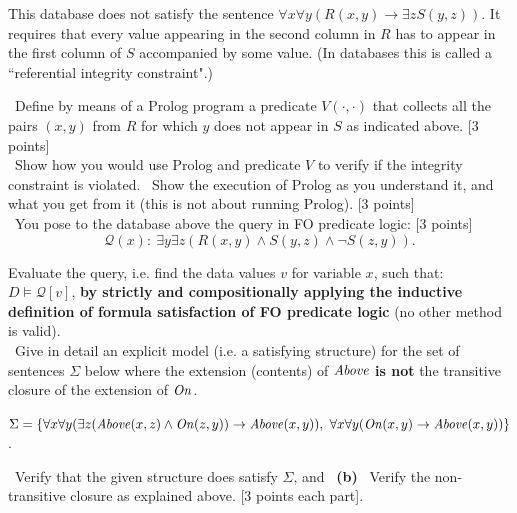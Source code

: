 \documentclass[12pt,fullpage]{article}
\newcommand{\nit}[1]{{\it #1}}
\begin{document}
\vspace{1mm}This database does not satisfy the sentence $\forall x \forall y(R(x,y) \rightarrow \exists zS(y,z))$. It requires that every value appearing in the second
column in $R$ has to appear in the first column of $S$ accompanied by some value. (In databases this is called a ``referential integrity constraint".)

\vspace{2mm}
 \ Define by means of a Prolog program a predicate $V(\cdot,\cdot)$ that collects all the pairs $(x,y)$ from $R$ for which $y$ does not appear in $S$ as indicated above. \hfill [3 points]\\

 \ Show how you would use Prolog and predicate $V$ to verify if the integrity constraint is violated. \ Show the execution of Prolog as you understand it, and what you get from it (this is not about running Prolog). \hfill [3 points]\\

 \ You  pose to the database above the query in FO predicate logic: \hfill [3 points]
$$\mathcal{Q}(x)\!: \ \exists y \exists z(R(x,y) \wedge S(y,z) \wedge \neg S(z,y)).$$

\newpage \vspace*{-1cm}
Evaluate the query, i.e. find the data values $v$ for variable $x$, such that: \ $D \models \mathcal{Q}[v]$, {\bf by strictly and compositionally applying the inductive definition of formula satisfaction of 
FO predicate logic} (no other method is valid).\\


 \ Give in detail an explicit   model (i.e. a satisfying structure) for the set of sentences $\Sigma$ below where the extension (contents) of
$\nit{Above}$ {\bf is not} the transitive closure of the extension of $\nit{On}$.

$\Sigma = \{\forall x \forall y (\exists z
(\nit{Above}(x,z) \wedge
\nit{On}(z,y)) \rightarrow \nit{Above}(x,y)), \  \forall x \forall y
(\nit{On}(x,y) \rightarrow
\nit{Above}(x,y))\}$.

 \ Verify that the given structure does satisfy $\Sigma$, and \ {\bf (b)} \ Verify the non-transitive closure as explained above. \hfill [3 points each part]. \\
\end{document}

